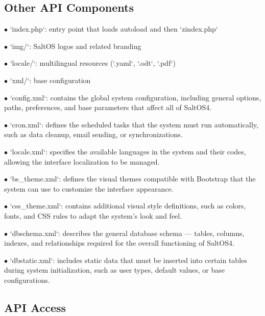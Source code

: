 \documentclass[a4paper]{article}
\begin{document}
\hypertarget{toc7}{}
\subsection{Other API Components}

\begin{compactitem}
\item[\color{myblue}$\bullet$] `index.php`: entry point that loads autoload and then `zindex.php`
\item[\color{myblue}$\bullet$] `img/`: SaltOS logos and related branding
\item[\color{myblue}$\bullet$] `locale/`: multilingual resources (`.yaml`, `.odt`, `.pdf`)
\item[\color{myblue}$\bullet$] `xml/`: base configuration
  \begin{compactitem}
  \item[\color{myblue}$\bullet$] `config.xml`: contains the global system configuration, including general options, paths, preferences, and base parameters that affect all of SaltOS4.
  \item[\color{myblue}$\bullet$] `cron.xml`: defines the scheduled tasks that the system must run automatically, such as data cleanup, email sending, or synchronizations.
  \item[\color{myblue}$\bullet$] `locale.xml`: specifies the available languages in the system and their codes, allowing the interface localization to be managed.
  \item[\color{myblue}$\bullet$] `bs\_theme.xml`: defines the visual themes compatible with Bootstrap that the system can use to customize the interface appearance.
  \item[\color{myblue}$\bullet$] `css\_theme.xml`: contains additional visual style definitions, such as colors, fonts, and CSS rules to adapt the system's look and feel.
  \item[\color{myblue}$\bullet$] `dbschema.xml`: describes the general database schema — tables, columns, indexes, and relationships required for the overall functioning of SaltOS4.
  \item[\color{myblue}$\bullet$] `dbstatic.xml`: includes static data that must be inserted into certain tables during system initialization, such as user types, default values, or base configurations.
  \end{compactitem}
\end{compactitem}

\hypertarget{toc8}{}
\subsection{API Access}
\end{document}
